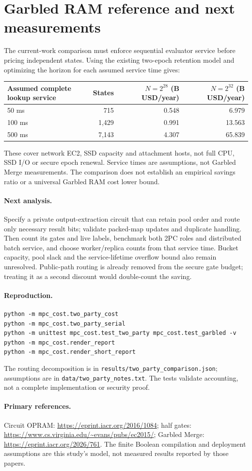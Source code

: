 \section{Garbled RAM reference and next measurements}
The current-work comparison must enforce sequential evaluator service before
pricing independent states. Using the existing two-epoch retention model and
optimizing the horizon for each assumed service time gives:
\begin{center}\small
\begin{tabular}{lrrr}\toprule
Assumed complete lookup service & States & $N=2^{28}$ (B USD/year) & $N=2^{32}$ (B USD/year)\\\midrule
50 ms & 715 & 0.548 & 6.979 \\
100 ms & 1,429 & 0.991 & 13.563 \\
500 ms & 7,143 & 4.307 & 65.839 \\
\bottomrule\end{tabular}\end{center}
These cover network EC2, SSD capacity and attachment hosts, not full CPU,
SSD I/O or secure epoch renewal. Service times are assumptions, not Garbled
Merge measurements. The comparison does not establish an empirical savings
ratio or a universal Garbled RAM cost lower bound.

\paragraph{Next analysis.}
Specify a private output-extraction circuit that can retain pool order and
route only necessary result bits; validate packed-map updates and duplicate
handling. Then count its gates and live labels, benchmark both 2PC roles and
distributed batch service, and choose worker/replica counts from that service
time. Bucket capacity, pool slack and the service-lifetime overflow bound also
remain unresolved. Public-path routing is already removed from the secure
gate budget; treating it as a second discount would double-count the saving.

\paragraph{Reproduction.}
\begin{verbatim}
python -m mpc_cost.two_party_cost
python -m mpc_cost.two_party_serial
python -m unittest mpc_cost.test_two_party mpc_cost.test_garbled -v
python -m mpc_cost.render_report
python -m mpc_cost.render_short_report
\end{verbatim}
The routing decomposition is in
\texttt{results/two\_party\_comparison.json}; assumptions are in
\texttt{data/two\_party\_notes.txt}. The tests validate accounting, not a
complete implementation or security proof.

\paragraph{Primary references.}
Circuit OPRAM: \url{https://eprint.iacr.org/2016/1084};
half gates: \url{https://www.cs.virginia.edu/~evans/pubs/ec2015/};
Garbled Merge: \url{https://eprint.iacr.org/2026/761}.
The finite Boolean compilation and deployment assumptions are this study's
model, not measured results reported by those papers.
